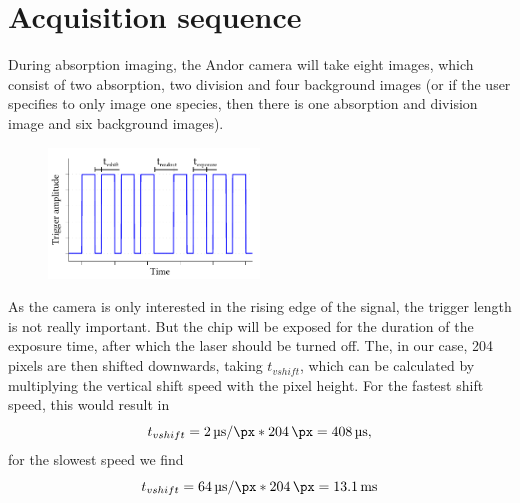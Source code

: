 \appendix
\chapter{Acquisition sequence}
\label{ch:acqseq}
During absorption imaging, the Andor camera will take eight images, which consist of two absorption, two division and four background images (or if the user specifies to only image one species, then there is one absorption and division image and six background images).

\begin{figure}[hb]
	\begin{center}
		\includegraphics[width=0.5\textwidth]{drafts/acqseq.pdf}
	\end{center}
	\label{fig:acqseq}
\end{figure}

As the camera is only interested in the rising edge of the signal, the trigger length is not really important. But the chip will be exposed for the duration of the exposure time, after which the laser should be turned off. The, in our case, 204 pixels are then shifted downwards, taking $t_{vshift}$, which can be calculated by multiplying the vertical shift speed with the pixel height. For the fastest shift speed, this would result in
\begin{equation}
t_{vshift} = \SI{2}{\micro\second\per\px} * \SI{204}{\px} = \SI{408}{\micro\second},
\end{equation}
for the slowest speed we find
\begin{equation}
t_{vshift} = \SI{64}{\micro\second\per\px} * \SI{204}{\px} = \SI{13.1}{\milli\second}
\end{equation}

